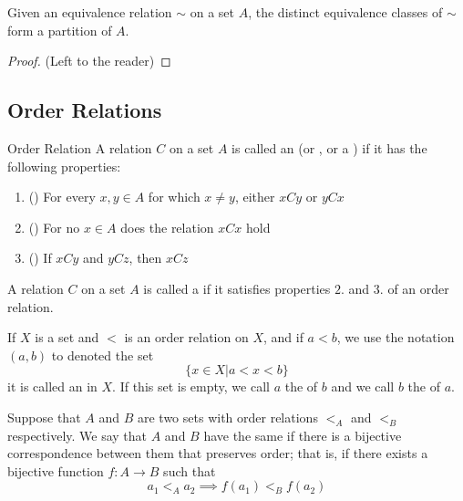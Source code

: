     \begin{proposition}
        Given an equivalence relation $\sim$ on a set $A$, the distinct equivalence classes of $\sim$ form a partition of $A$.
    \end{proposition}
    \begin{proof}
        (Left to the reader)
    \end{proof}

    \subsection{Order Relations}

    \begin{definition}{Order Relation}
        A relation $C$ on a set $A$ is called an  (or , or a ) if it has the following properties: \begin{enumerate}
            \item () For every $x,y \in A$ for which $x \neq y$, either $xCy$ or $yCx$
            \item () For no $x \in A$ does the relation $xCx$ hold
            \item () If $xCy$ and $yCz$, then $xCz$
        \end{enumerate}
    \end{definition}

    \begin{definition}
        A relation $C$ on a set $A$ is called a  if it satisfies properties $2.$ and $3.$ of an order relation.
    \end{definition}

    
    \begin{definition}
        If $X$ is a set and $<$ is an order relation on $X$, and if $a < b$, we use the notation $(a,b)$ to denoted the set \begin{equation*}
            \{x \in X\vert a < x < b\}
        \end{equation*}
        it is called an  in $X$. If this set is empty, we call $a$ the  of $b$ and we call $b$ the  of $a$.
    \end{definition}

    \begin{definition}
        Suppose that $A$ and $B$ are two sets with order relations $<_A$ and $<_B$ respectively. We say that $A$ and $B$ have the same  if there is a bijective correspondence between them that preserves order; that is, if there exists a bijective function $f:A\rightarrow B$ such that \begin{equation*}
            a_1 <_A a_2 \implies f(a_1) <_B f(a_2)
        \end{equation*}
    \end{definition}

